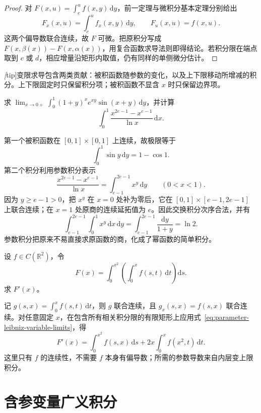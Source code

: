 \begin{proof}
对 $F(x,u)=\int_c^u f(x,y)\,\mathrm{d}y$，前一定理与微积分基本定理分别给出
\[
    F_x(x,u)=\int_c^u f_x(x,y)\,\mathrm{d}y,
    \qquad F_u(x,u)=f(x,u).
\]
这两个偏导数联合连续，故 $F$ 可微。把原积分写成 $F(x,\beta(x))-F(x,\alpha(x))$，用复合函数求导法则即得结论。若积分限在端点取到 $c$ 或 $d$，相应增量沿矩形内取值，仍有同样的单侧微分估计。
\end{proof}

\emph[tip]{变限求导包含两类贡献：被积函数随参数的变化，以及上下限移动所增减的积分。}上下限固定时只保留积分项；被积函数不显含 $x$ 时只保留边界项。

\begin{example}
\label{ex:parameter-finite-limit-and-logarithm}
求 $\displaystyle\lim_{x\to0+}\int_0^1(1+y)^x e^{xy}\sin(x+y)\,\mathrm{d}y$，并计算
\[
    \int_0^1\frac{x^{2e-1}-x^{e-1}}{\ln x}\,\mathrm{d}x.
\]
\end{example}

\begin{solve}
第一个被积函数在 $[0,1]\times[0,1]$ 上连续，故极限等于
\[
    \int_0^1\sin y\,\mathrm{d}y=1-\cos1.
\]
第二个积分利用参数积分表示
\[
    \frac{x^{2e-1}-x^{e-1}}{\ln x}
    =\int_{e-1}^{2e-1}x^y\,\mathrm{d}y\qquad(0<x<1).
\]
因为 $y\geq e-1>0$，把 $x^y$ 在 $x=0$ 处补为零后，它在 $[0,1]\times[e-1,2e-1]$ 上联合连续；在 $x=1$ 处原商的连续延拓值为 $e$。因此交换积分次序合法，并有
\[
    \int_{e-1}^{2e-1}\int_0^1 x^y\,\mathrm{d}x\,\mathrm{d}y
    =\int_{e-1}^{2e-1}\frac{\mathrm{d}y}{1+y}
    =\ln2.
\]
参数积分把原来不易直接求原函数的商，化成了幂函数的简单积分。
\end{solve}

\begin{example}
\label{ex:parameter-nested-variable-limits}
设 $f\in C(\mathbb R^2)$，令
\[
    F(x)=\int_0^{x^2}\left(\int_0^x f(s,t)\,\mathrm{d}t\right)\mathrm{d}s.
\]
求 $F'(x)$。
\end{example}

\begin{solve}
记 $g(s,x)=\int_0^x f(s,t)\,\mathrm{d}t$，则 $g$ 联合连续，且 $g_x(s,x)=f(s,x)$ 联合连续。对任意固定 $x$，在包含所有相关积分限的有限矩形上应用式~\eqref{eq:parameter-leibniz-variable-limits}，得
\[
    F'(x)=\int_0^{x^2}f(s,x)\,\mathrm{d}s
      +2x\int_0^x f(x^2,t)\,\mathrm{d}t.
\]
这里只有 $f$ 的连续性，不需要 $f$ 本身有偏导数；所需的参数导数来自内层变上限积分。
\end{solve}

\section{含参变量广义积分}
\label{sec:parameter-dependent-improper-integrals}

